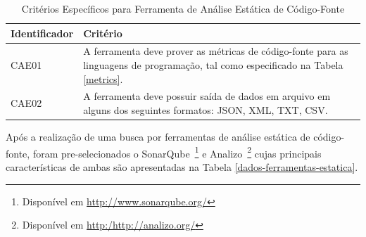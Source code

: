 	\begin{table}[!ht]
	\begin{center}
	 \begin{tabular}{|l|p{10cm}|}
		\hline
		Identificador & Critério 
		\\ \hline
		CAE01 & A ferramenta deve prover as métricas de código-fonte para as linguagens de programação, tal como especificado na Tabela \ref{metrics}.
		\\ \hline
		CAE02 & A ferramenta deve possuir saída de dados em arquivo em alguns dos seguintes formatos: JSON, XML, TXT, CSV.      
		\\ \hline
		\end{tabular}
		\caption{Critérios Específicos para Ferramenta de Análise Estática de Código-Fonte}
		\label{specific}
		\end{center}
		\end{table}	

Após a realização de uma busca por ferramentas de análise estática de código-fonte, foram pre-selecionados o SonarQube~\footnote{Disponível em \url{http://www.sonarqube.org/}} e Analizo~\footnote{Disponível em \url{http:/http://analizo.org/}} cujas principais características de ambas são apresentadas na Tabela \ref{dados-ferramentas-estatica}.

